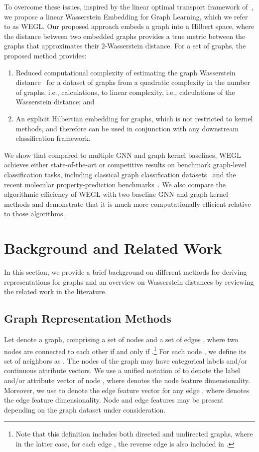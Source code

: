 \documentclass[table]{article} \usepackage{iclr2021_conference,times}
\begin{document}
To overcome these issues, inspired by the linear optimal transport framework of~\citep{wang2013linear}, we propose a linear Wasserstein Embedding for Graph Learning, which we refer to as WEGL. Our proposed approach embeds a graph into a Hilbert space, where the  distance between two embedded graphs provides a true metric between the graphs that approximates their 2-Wasserstein distance. For a set of  graphs, the proposed method provides: 
\begin{enumerate}
\item Reduced computational complexity of estimating the graph Wasserstein distance~\citep{togninalli2019wasserstein} for a dataset of  graphs from a quadratic complexity in the number of graphs, i.e.,  calculations, to linear complexity, i.e.,  calculations of the Wasserstein distance; and
\item An explicit Hilbertian embedding for graphs, which is not restricted to kernel methods, and therefore can be used in conjunction with any downstream classification framework.
\end{enumerate} 
We show that compared to multiple GNN and graph kernel baselines, WEGL achieves either state-of-the-art or competitive results on benchmark graph-level classification tasks, including classical graph classification datasets~\citep{KKMMN2016} and the recent molecular property-prediction benchmarks~\citep{hu2020open}. We also compare the algorithmic efficiency of WEGL with two baseline GNN and graph kernel methods and demonstrate that it is much more computationally efficient relative to those algorithms.

\vspace{-0.05in}
\section{Background and Related Work}
\vspace{-0.05in}
In this section, we provide a brief background on different methods for deriving representations for graphs and an overview on Wasserstein distances by reviewing the related work in the literature.

\vspace{-0.05in}
\subsection{Graph Representation Methods}
\vspace{-0.05in}
Let  denote a graph, comprising a set of nodes  and a set of edges , where two nodes  are connected to each other if and only if .\footnote{Note that this definition includes both directed and undirected graphs, where in the latter case, for each edge , the reverse edge  is also included in .} For each node , we define its set of neighbors as . The nodes of the graph  may have categorical labels and/or continuous attribute vectors. We use a unified notation of  to denote the label and/or attribute vector of node , where  denotes the node feature dimensionality. Moreover, we use  to denote the edge feature vector for any edge , where  denotes the edge feature dimensionality. Node and edge features may be present depending on the graph dataset under consideration.
\end{document}
